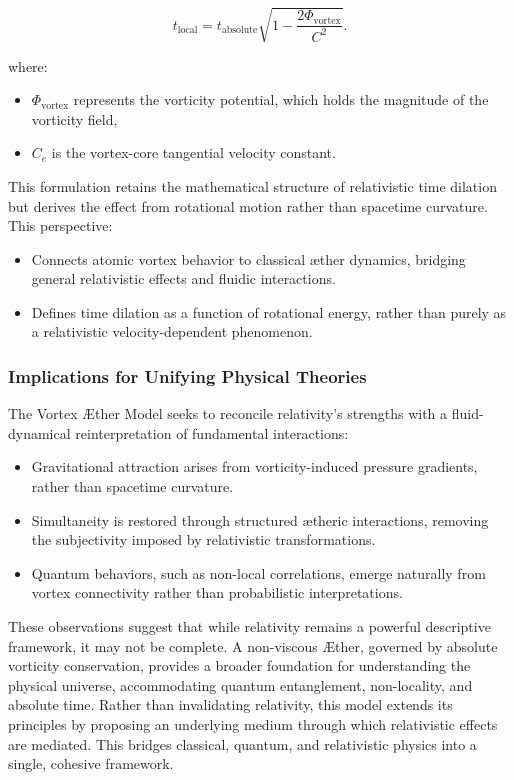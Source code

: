 \documentclass[a4paper,10pt]{article}
\begin{document}
\begin{equation*}
    t_\text{local} = t_\text{absolute} \sqrt{1 - \frac{2 \Phi_\text{vortex}}{C^2}}.\label{eq:TimeDilation}
\end{equation*}

where:

\begin{itemize}
    \item $\Phi_\text{vortex}$ represents the vorticity potential, which holds the magnitude of the vorticity field,
    \item $C_e$ is the vortex-core tangential velocity constant.
\end{itemize}
This formulation retains the mathematical structure of relativistic time dilation but derives the effect from rotational motion rather than spacetime curvature.
This perspective:

\begin{itemize}
    \item Connects atomic vortex behavior to classical æther dynamics, bridging general relativistic effects and fluidic interactions.
    \item Defines time dilation as a function of rotational energy, rather than purely as a relativistic velocity-dependent phenomenon.
\end{itemize}
\subsubsection*{Implications for Unifying Physical Theories}
The Vortex Æther Model seeks to reconcile relativity's strengths with a fluid-dynamical reinterpretation of fundamental interactions:

\begin{itemize}
    \item Gravitational attraction arises from vorticity-induced pressure gradients, rather than spacetime curvature.
    \item Simultaneity is restored through structured ætheric interactions, removing the subjectivity imposed by relativistic transformations.
    \item Quantum behaviors, such as non-local correlations, emerge naturally from vortex connectivity rather than probabilistic interpretations.
\end{itemize}
These observations suggest that while relativity remains a powerful descriptive framework, it may not be complete. A non-viscous Æther, governed by absolute vorticity conservation, provides a broader foundation for understanding the physical universe, accommodating quantum entanglement, non-locality, and absolute time.
Rather than invalidating relativity, this model extends its principles by proposing an underlying medium through which relativistic effects are mediated.
This bridges classical, quantum, and relativistic physics into a single, cohesive framework.
\end{document}
